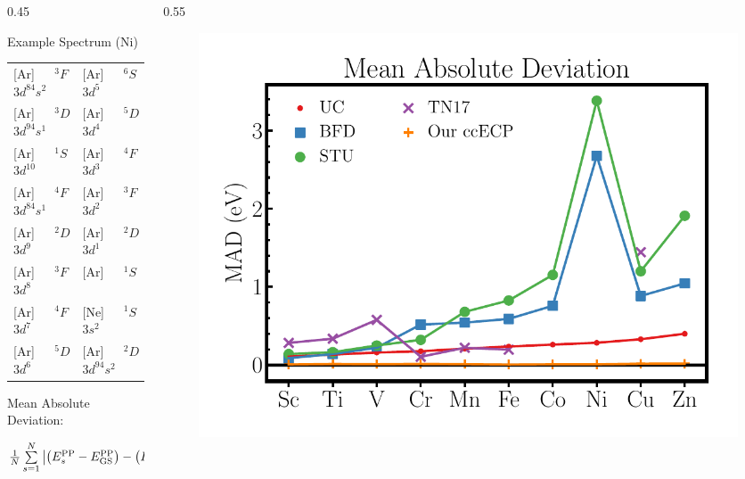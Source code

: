 \begin{frame}
    \begin{columns}
	\begin{column}
	    {0.45\textwidth}
	    \begin{block}
		{Example Spectrum (Ni)}
                \begin{table}
		    \scriptsize
                \centering
                \begin{tabular}{ll|ll}
		{[Ar] $3d^84s^2$ }  & $^3F$ &  {[Ar] $3d^5$ }      & $^6S$\\
                {[Ar] $3d^94s^1$ }  & $^3D$ &  {[Ar] $3d^4$ }      & $^5D$\\ 
                {[Ar] $3d^{10}$ }   & $^1S$ &  {[Ar] $3d^3$ }      & $^4F$\\
                {[Ar] $3d^84s^1$ }  & $^4F$ &  {[Ar] $3d^2$ }      & $^3F$\\
                {[Ar] $3d^9$ }      & $^2D$ &  {[Ar] $3d^1$ }      & $^2D$\\
                {[Ar] $3d^8$ }      & $^3F$ &  {[Ar] }             & $^1S$\\
                {[Ar] $3d^7$ }      & $^4F$ &  {[Ne] $3s^2$ }      & $^1S$\\
                {[Ar] $3d^6$ }      & $^5D$ &  {[Ar] $3d^94s^2$ }  & $^2D$\\
                \end{tabular}
                \end{table}
	    \end{block}
	    {\color{wolfred}Mean Absolute Deviation:}
	    \small{
		\begin{tcolorbox}[enhanced,drop lifted shadow,boxrule=0.1pt,colback=blue!15]
		    $\frac{1}{N}\sum\limits_{s=1}^N \left| \left( E_s^{\rm PP}-E_{\rm GS}^{\rm PP} \right) - \left( E_s^{\rm AE}-E_{GS}^{\rm AE} \right)\right| $
	        \end{tcolorbox}
	    }
	\end{column}
	\begin{column}
	    {0.55\textwidth}
   	     \begin{figure}[h]
   	         \centering
		 \includegraphics[width=\textwidth]{figures/mad}

\end{figure}
\end{column}
\end{columns}
\end{frame}
